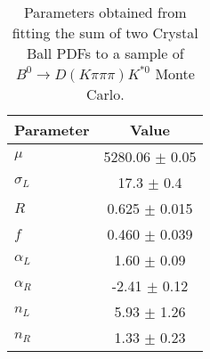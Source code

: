 \begin{table}[h]
  \centering
  \begin{tabular}{lc}
      \toprule
      Parameter & Value \\
      \midrule
      $\mu$ & 5280.06 $\pm$ 0.05 \\
      $\sigma_L$ & 17.3 $\pm$ 0.4 \\
      $R$ & 0.625 $\pm$ 0.015 \\
      $f$ & 0.460 $\pm$ 0.039 \\
      $\alpha_L$ & 1.60 $\pm$ 0.09 \\
      $\alpha_R$ & -2.41 $\pm$ 0.12 \\
      $n_L$ & 5.93 $\pm$ 1.26 \\
      $n_R$ & 1.33 $\pm$ 0.23 \\
  \bottomrule
  \end{tabular}
  \caption{Parameters obtained from fitting the sum of two Crystal Ball PDFs to a sample of $B^0 \to D(K\pi\pi\pi)K^{*0}$ Monte Carlo.}
\label{tab:signal_Kpipipi_MC_params}
\end{table}
